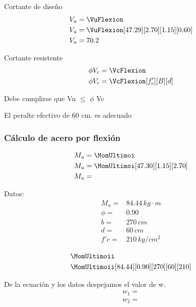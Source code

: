 \documentclass{article}%
\begin{document}

Cortante de diseño
\begin{align}
	V_u &= \VuFlexion \\
	V_u &= \VuFlexion[47.29][2.70][1.15][0.60] \nonumber \\
	V_u &=  70.2\nonumber
\end{align}

Cortante resistente
\begin{align}
	\phi V_{c} &= \VcFlexion \\
	\phi V_{c} &= \VcFlexion[f'_c][B][d] \nonumber
\end{align}

Debe cumplirse que Vu $\leq$ $\phi$ Vc

El peralte efectivo de 60 cm. es adecuado


\subsubsection{Cálculo de acero por flexión}
\begin{align}
	M_u &= \MomUltimoi \\
	M_u &= \MomUltimoi[47.30][1.15][2.70] \nonumber \\
	M_u &= \nonumber
\end{align}

Datos:
\[
\begin{array}{cc}
    M_u =   &   84.44   \,  kg\cdot m   \\
    \phi =  &   0.90                \\
    b =     &   270     \,  cm      \\
    d =     &   60      \,  cm      \\
    f'c =   &   210     \,  kg/cm^2
\end{array}
\]

\begin{align}
	&\MomUltimoii \\
	&\MomUltimoii[84.44][0.90][270][60][210] \nonumber
\end{align}

De la ecuación y los datos despejamos el valor de w.
\begin{align*}
    w_1 = \\
    w_2 = 
\end{align*}
\end{document}
